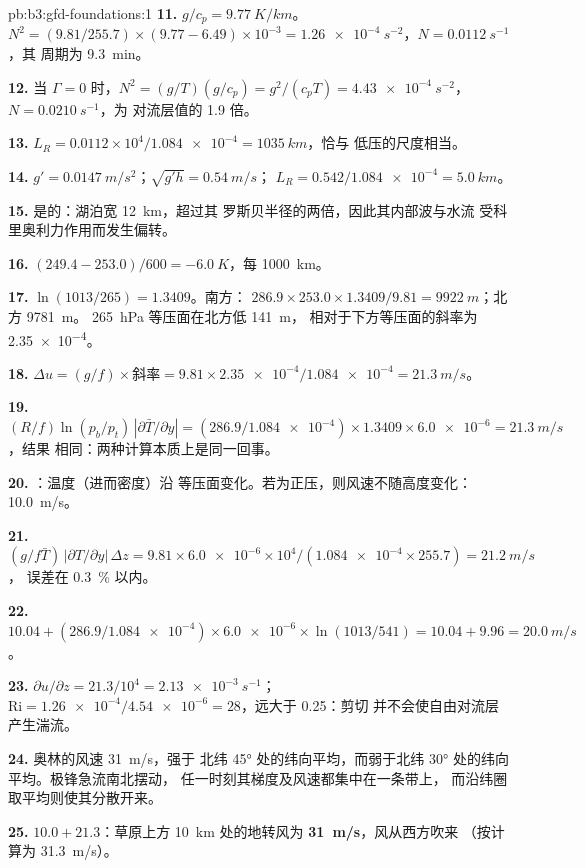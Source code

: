 \begin{solution}{pb:b3:gfd-foundations:1}
\textbf{11.} $g/c_p = \qty{9.77}{K/km}$。$N^2 = (9.81/255.7)\times(9.77 -
6.49)\times10^{-3} = \qty{1.26e-4}{s^{-2}}$，$N = \qty{0.0112}{s^{-1}}$，其
周期为 \qty{9.3}{min}。

\textbf{12.} 当 $\Gamma = 0$ 时，$N^2 = (g/T)(g/c_p) = g^2/(c_pT) =
\qty{4.43e-4}{s^{-2}}$，$N = \qty{0.0210}{s^{-1}}$，为
对流层值的 1.9 倍。

\textbf{13.} $L_R = 0.0112\times10^4/\num{1.084e-4} = \qty{1035}{km}$，恰与
低压的尺度相当。

\textbf{14.} $g' = \qty{0.0147}{m/s^2}$；$\sqrt{g'h} = \qty{0.54}{m/s}$；
$L_R = 0.542/\num{1.084e-4} = \qty{5.0}{km}$。

\textbf{15.} 是的：湖泊宽 \qty{12}{km}，超过其
罗斯贝半径的两倍，因此其内部波与水流
受科里奥利力作用而发生偏转。

\textbf{16.} $(249.4 - 253.0)/600 = \qty{-6.0}{K}$，每 \qty{1000}{km}。

\textbf{17.} $\ln(1013/265) = 1.3409$。南方：
$286.9\times253.0\times1.3409/9.81 = \qty{9922}{m}$；北方 \qty{9781}{m}。
\qty{265}{hPa} 等压面在北方低 \qty{141}{m}，
相对于下方等压面的斜率为 \num{2.35e-4}。

\textbf{18.} $\Delta u = (g/f)\times\text{斜率} = 9.81\times\num{2.35e-4}/
\num{1.084e-4} = \qty{21.3}{m/s}$。

\textbf{19.} $(R/f)\ln(p_b/p_t)\,|\partial\bar T/\partial y| =
(286.9/\num{1.084e-4})\times1.3409\times\num{6.0e-6} = \qty{21.3}{m/s}$，结果
相同：两种计算本质上是同一回事。

\textbf{20.} ：温度（进而密度）沿
等压面变化。若为正压，则风速不随高度变化：
\qty{10.0}{m/s}。

\textbf{21.} $(g/f\bar T)\,|\partial T/\partial y|\,\Delta z = 9.81\times
\num{6.0e-6}\times10^4/(\num{1.084e-4}\times255.7) = \qty{21.2}{m/s}$，
误差在 \qty{0.3}{\percent} 以内。

\textbf{22.} $10.04 + (286.9/\num{1.084e-4})\times\num{6.0e-6}\times
\ln(1013/541) = 10.04 + 9.96 = \qty{20.0}{m/s}$。

\textbf{23.} $\partial u/\partial z = 21.3/10^4 = \qty{2.13e-3}{s^{-1}}$；
$\mathrm{Ri} = \num{1.26e-4}/\num{4.54e-6} = 28$，远大于 0.25：剪切
并不会使自由对流层产生湍流。

\textbf{24.} 奥林的风速 \qty{31}{m/s}，强于
北纬 \ang{45} 处的纬向平均，而弱于北纬 \ang{30} 处的纬向平均。极锋急流南北摆动，
任一时刻其梯度及风速都集中在一条带上，
而沿纬圈取平均则使其分散开来。

\textbf{25.} $10.0 + 21.3$：草原上方 \qty{10}{km} 处的地转风为
\textbf{\qty[text-series-to-math=true]{31}{m/s}}，风从西方吹来
（按计算为 \qty{31.3}{m/s}）。
\end{solution}
